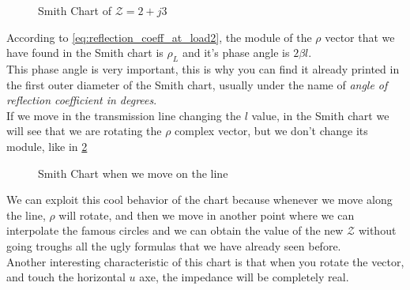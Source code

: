 \begin{figure}[H]
    \begin{center}
    \end{center}\caption{Smith Chart of $\mathcal{Z} = 2+j3$}\label{fig:example2_rho} 
\end{figure}
According to \cref{eq:reflection_coeff_at_load2}, the module of the $\rho$ vector that we have found in the Smith chart is $\rho_L$ and it's phase angle is $2\beta l$.\\
This phase angle is very important, this is why you can find it already printed in the first outer diameter of the Smith chart, usually under the name of \emph{angle of reflection coefficient in degrees}.\\
If we move in the transmission line changing the $l$ value, in the Smith chart we will see that we are rotating the $\rho$ complex vector, but we don't change its module, like in \cref{fig:example2_rho2} 
\begin{figure}[H]
    \begin{center}
    \end{center}\caption{Smith Chart when we move on the line}\label{fig:example2_rho2} 
\end{figure}
We can exploit this cool behavior of the chart because whenever we move along the line, $\rho$ will rotate, and then we move in another point where we can interpolate the famous circles and we can obtain the value of the new $\mathcal{Z}$ without going troughs all the ugly formulas that we have already seen before.\\
Another interesting characteristic of this chart is that when you rotate the vector, and touch the horizontal $u$ axe, the impedance will be completely real.

